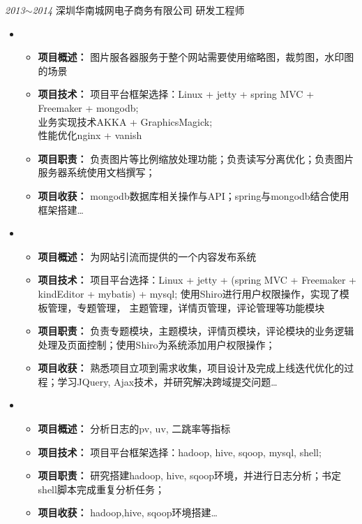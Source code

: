 \documentclass[line,margin]{res}
\begin{document}
\begin{resume}
\begin{itemize}
\end{itemize}

 {\sl 2013$\sim$2014} \hfill 深圳华南城网电子商务有限公司 \hfill 研发工程师 \\
\begin{itemize}
\item {} \\
    \begin{itemize}
		\item {\bf 项目概述：} 图片服各器服务于整个网站需要使用缩略图，裁剪图，水印图的场景
		\item {\bf 项目技术：} 项目平台框架选择：Linux + jetty + spring MVC + Freemaker + mongodb; \\
		 业务实现技术AKKA + GraphicsMagick; \\
		 性能优化nginx + vanish
        \item {\bf 项目职责：} 负责图片等比例缩放处理功能；负责读写分离优化；负责图片服务器系统使用文档撰写；
		\item {\bf 项目收获：} mongodb数据库相关操作与API；spring与mongodb结合使用框架搭建\ldots 
	\end{itemize}			

\item {} \\
    \begin{itemize}
		\item {\bf 项目概述：} 为网站引流而提供的一个内容发布系统
		\item {\bf 项目技术：} 项目平台选择：Linux + jetty + (spring MVC + Freemaker + kindEditor + mybatis) + mysql; 使用Shiro进行用户权限操作，实现了模板管理，专题管理， 主题管理，详情页管理，评论管理等功能模块
        \item {\bf 项目职责：} 负责专题模块，主题模块，评情页模块，评论模块的业务逻辑处理及页面控制；使用Shiro为系统添加用户权限操作；
		\item {\bf 项目收获：} 熟悉项目立项到需求收集，项目设计及完成上线迭代优化的过程；学习JQuery, Ajax技术，并研究解决跨域提交问题\ldots 
	\end{itemize}	

\item {} \\
    \begin{itemize}
		\item {\bf 项目概述：} 分析日志的pv, uv, 二跳率等指标
		\item {\bf 项目技术：} 项目平台框架选择：hadoop, hive, sqoop, mysql, shell; \\
        \item {\bf 项目职责：} 研究搭建hadoop, hive, sqoop环境，并进行日志分析；书定shell脚本完成重复分析任务；
		\item {\bf 项目收获：} hadoop,hive, sqoop环境搭建\ldots 
	\end{itemize}	


\end{itemize}
\end{resume}
\end{document}
